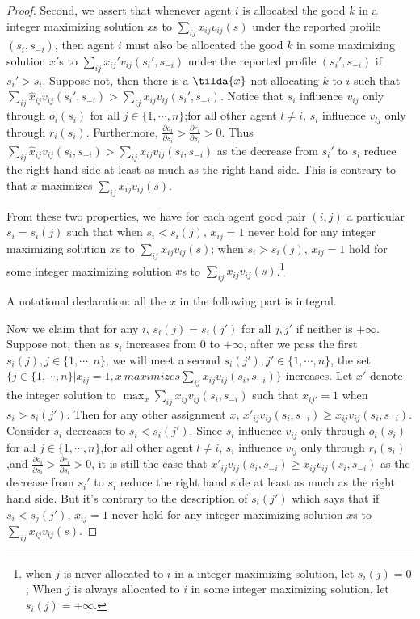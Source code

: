 \begin{proof}
 Second, we assert that whenever agent $i$ is allocated the good $k$ in a integer maximizing solution $x$s to  $\sum_{ij}x_{ij}v_{ij}(s)$ under the reported profile $(s_i,s_{-i})$, then agent $i$ must also be allocated the good $k$ in some maximizing solution $x'$s to  $\sum_{ij}x_{ij}'v_{ij}(s_i', s_{-i})$ under the reported profile $(s_i',s_{-i})$ if $s_i' > s_i$. Suppose not, then there is a $\tilda{x}$ not allocating $k$ to $i$ such that $\sum_{ij}\hat{x}_{ij}v_{ij}(s_i', s_{-i}) > \sum_{ij}x_{ij}v_{ij}(s_i',s_{-i})$. Notice that $s_i$ influence $v_{ij}$ only through $o_i(s_i)$ for all $j \in \{1,\cdots,n\}$;for all other agent $l \not = i$, $s_i$ influence $v_{lj}$ only through $r_i(s_i)$. Furthermore, $\frac{\partial o_i}{\partial s_i}> \frac{\partial r_i}{\partial s_i} > 0$. Thus $\sum_{ij}\hat{x}_{ij}v_{ij}(s_i, s_{-i}) > \sum_{ij}x_{ij}v_{ij}(s_i,s_{-i})$ as the decrease from $s_i'$ to $s_i$ reduce the right hand side at least as much as the right hand side. This is contrary to  that $x$ maximizes $\sum_{ij}x_{ij}v_{ij}(s)$.
 
 From these two properties, we have for each agent good pair $(i,j)$ a particular $s_i=s_i(j)$ such that when $s_i < s_i(j)$, $x_{ij}=1$ never hold for any integer maximizing solution $x$s to  $\sum_{ij}x_{ij}v_{ij}(s)$; when $s_i > s_i(j)$, $x_{ij}=1$ hold for some integer maximizing solution $x$s to  $\sum_{ij}x_{ij}v_{ij}(s)$.\footnote{when $j$ is never allocated to $i$ in a integer maximizing solution, let $s_i(j)=0$; When $j$ is always allocated to $i$ in some integer maximizing solution, let $s_i(j)=+\infty$.}

 A notational declaration: all the $x$ in the following part is integral.

 Now we claim that for any $i$, $s_i(j)=s_i(j')$ for all $j, j'$ if neither is $+\infty$.  Suppose not, then as $s_i$ increases from $0$ to $+\infty$, after we pass the first
 $s_i(j),j \in \{1,\cdots,n\}$, we will meet a second $s_i(j'), j' \in \{1,\cdots,n\}$, the set $\{j \in  \{1,\cdots,n\}| x_{ij}=1, x\ maximizes \sum_{ij}x_{ij}v_{ij}(s_i,s_{-i})\}$ increases. Let $x'$ denote the integer solution to $\max_x\sum_{ij}x_{ij}v_{ij}(s_i,s_{-i})$
 such that $x_{ij'}=1$ when $s_i > s_i(j')$. Then for any other assignment $x$, $x'_{ij}v_{ij}(s_i,s_{-i}) \geq x_{ij}v_{ij}(s_i,s_{-i})$. Consider $s_i$ decreases to  $s_i < s_i(j')$. Since  $s_i$ influence $v_{ij}$ only through $o_i(s_i)$ for all $j \in \{1,\cdots,n\}$,for all other agent $l \not = i$, $s_i$ influence $v_{lj}$ only through $r_i(s_i)$,and $\frac{\partial o_i}{\partial s_i}> \frac{\partial r_i}{\partial s_i} > 0$, it is still the case that $x'_{ij}v_{ij}(s_i,s_{-i}) \geq x_{ij}v_{ij}(s_i,s_{-i})$  as the decrease from $s_i'$ to $s_i$ reduce the right hand side at least as much as the right hand side. But it's contrary to the description of $s_i(j')$ which says that if $s_i < s_j(j')$,  $x_{ij}=1$ never hold for any integer maximizing solution $x$s to  $\sum_{ij}x_{ij}v_{ij}(s)$.


\end{proof}
